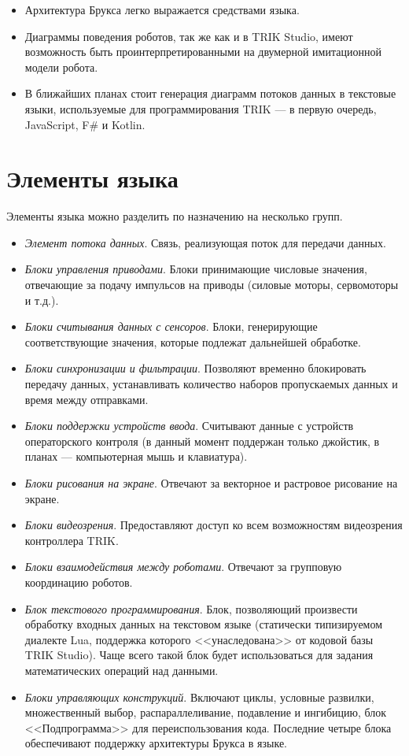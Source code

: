 \documentclass[conference]{IEEEtran}
\begin{document}
\begin{itemize}
\item Архитектура Брукса легко выражается средствами языка.
\item Диаграммы поведения роботов, так же как и в TRIK Studio, имеют возможность быть проинтерпретированными на двумерной имитационной модели робота. 
\item В ближайших планах стоит генерация диаграмм потоков данных в текстовые языки, используемые для программирования TRIK --- в первую очередь, JavaScript, F\#\cite{kirsanov2014robotics} и Kotlin.
\end{itemize}

\section*{Элементы языка}
Элементы языка можно разделить по назначению на несколько групп.

\begin{itemize}
\item \textit{Элемент потока данных}. Связь, реализующая поток для передачи данных. 
\item \textit{Блоки управления приводами}. Блоки принимающие числовые значения, отвечающие за подачу импульсов на приводы (силовые моторы, сервомоторы и т.д.).
\item \textit{Блоки считывания данных с сенсоров}. Блоки, генерирующие соответствующие значения, которые подлежат дальнейшей обработке.
\item \textit{Блоки синхронизации и фильтрации}. Позволяют временно блокировать передачу данных, устанавливать количество наборов пропускаемых данных и время между отправками. 
\item \textit{Блоки поддержки устройств ввода}. Считывают данные с устройств операторского контроля (в данный момент поддержан только джойстик, в планах --- компьютерная мышь и клавиатура). 
\item \textit{Блоки рисования на экране}. Отвечают за векторное и растровое рисование на экране.
\item \textit{Блоки видеозрения}. Предоставляют доступ ко всем возможностям видеозрения контроллера TRIK.
\item \textit{Блоки взаимодействия между роботами}. Отвечают за групповую координацию роботов.
\item \textit{Блок текстового программирования}. Блок, позволяющий произвести обработку входных данных на текстовом языке (статически типизируемом диалекте Lua, поддержка которого <<унаследована>> от кодовой базы TRIK Studio). Чаще всего такой блок будет использоваться для задания математических операций над данными.
\item \textit{Блоки управляющих конструкций}. Включают циклы, условные развилки, множественный выбор, распараллеливание, подавление и ингибицию, блок <<Подпрограмма>> для переиспользования кода. Последние четыре блока обеспечивают поддержку архитектуры Брукса в языке.

\end{itemize} 
\end{document}
